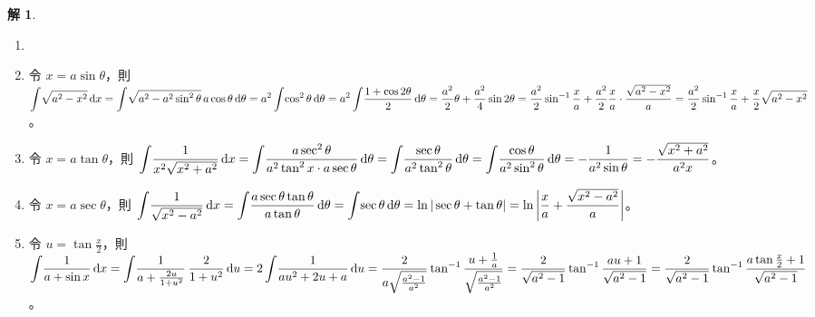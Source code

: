 \documentclass[12pt]{extarticle}
\newcommand{\ds}{\displaystyle}
\theoremstyle{definition}
\newtheorem*{sol}{解}
\begin{document}
\begin{sol}
  \begin{enumerate}\setlength{\itemsep}{0pt}
    \item[]
    \item 令 $\ds x = a\sin\theta$，則 $\ds\int\!\sqrt{a^2 - x^2}\,\text{d}x = \int\!\sqrt{a^2 - a^2\sin^2\theta}\,a\cos\theta\,\text{d}\theta = a^2\int\!\cos^2\theta\,\text{d}\theta = a^2\int\!\frac{1 + \cos2\theta}{2}\,\text{d}\theta \\ = \frac{a^2}{2}\theta + \frac{a^2}{4}\sin2\theta = \frac{a^2}{2}\sin^{-1}\frac{x}{a} + \frac{a^2}{2}\frac{x}{a}\cdot\frac{\sqrt{a^2 - x^2}}{a} = \frac{a^2}{2}\sin^{-1}\frac{x}{a} + \frac{x}{2}\sqrt{a^2 - x^2}$。
    \item 令 $\ds x = a\tan\theta$，則 $\ds\int\!\frac{1}{x^2\sqrt{x^2 + a^2}}\,\text{d}x = \int\!\frac{a\sec^2\theta}{a^2\tan^2 x\cdot a\sec\theta}\,\text{d}\theta = \int\!\frac{\sec\theta}{a^2\tan^2\theta}\,\text{d}\theta = \int\!\frac{\cos\theta}{a^2\sin^2\theta}\,\text{d}\theta \\= -\frac{1}{a^2\sin\theta} = -\frac{\sqrt{x^2 + a^2}}{a^2 x}$。
    \item 令 $\ds x = a\sec\theta$，則 $\ds\int\!\frac{1}{\sqrt{x^2 - a^2}}\,\text{d}x = \int\!\frac{a\sec\theta\tan\theta}{a\tan\theta}\,\text{d}\theta = \int\!\sec\theta\,\text{d}\theta = \ln|\sec\theta + \tan\theta| \\ = \ln\bigg|\frac{x}{a} + \frac{\sqrt{x^2 - a^2}}{a}\bigg|$。
    \item 令 $\ds u = \tan\frac{x}{2}$，則 $\ds\int\!\frac{1}{a + \sin x}\,\text{d}x = \int\!\frac{1}{a + \frac{2 u}{1 + u^2}}\,\frac{2}{1 + u^2}\,\text{d}u = 2\int\!\frac{1}{a u^2 + 2 u + a}\,\text{d}u = \frac{2}{a\sqrt{\frac{a^2 - 1}{a^2}}}\tan^{-1}\frac{{u + \frac{1}{a}}}{\sqrt{\frac{a^2 - 1}{a^2}}} \\ = \frac{2}{\sqrt{a^2 - 1}}\tan^{-1}\frac{a u + 1}{\sqrt{a^2 - 1}} = \frac{2}{\sqrt{a^2 - 1}}\tan^{-1}\frac{a\tan\frac{x}{2} + 1}{\sqrt{a^2 - 1}}$。
  \end{enumerate}
\end{sol}
\end{document}
